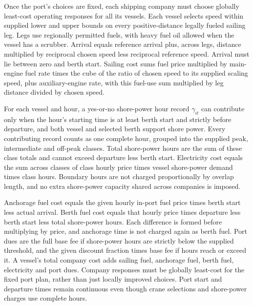 \documentclass[10pt]{article}
\begin{document}
Once the port's choices are fixed, each shipping company must choose globally least-cost operating responses for all its vessels. Each vessel selects speed within supplied lower and upper bounds on every positive-distance legally fueled sailing leg. Legs use regionally permitted fuels, with heavy fuel oil allowed when the vessel has a scrubber. Arrival equals reference arrival plus, across legs, distance multiplied by reciprocal chosen speed less reciprocal reference speed. Arrival must lie between zero and berth start. Sailing cost sums fuel price multiplied by main-engine fuel rate times the cube of the ratio of chosen speed to its supplied scaling speed, plus auxiliary-engine rate, with this fuel-use sum multiplied by leg distance divided by chosen speed.

For each vessel and hour, a yes-or-no shore-power hour record $\gamma_{it}$ can contribute only when the hour's starting time is at least berth start and strictly before departure, and both vessel and selected berth support shore power. Every contributing record counts as one complete hour, grouped into the supplied peak, intermediate and off-peak classes. Total shore-power hours are the sum of these class totals and cannot exceed departure less berth start. Electricity cost equals the sum across classes of class hourly price times vessel shore-power demand times class hours. Boundary hours are not charged proportionally by overlap length, and no extra shore-power capacity shared across companies is imposed.

Anchorage fuel cost equals the given hourly in-port fuel price times berth start less actual arrival. Berth fuel cost equals that hourly price times departure less berth start less total shore-power hours. Each difference is formed before multiplying by price, and anchorage time is not charged again as berth fuel. Port dues are the full base fee if shore-power hours are strictly below the supplied threshold, and the given discount fraction times base fee if hours reach or exceed it. A vessel's total company cost adds sailing fuel, anchorage fuel, berth fuel, electricity and port dues. Company responses must be globally least-cost for the fixed port plan, rather than just locally improved choices. Port start and departure times remain continuous even though crane selections and shore-power charges use complete hours.
\end{document}
